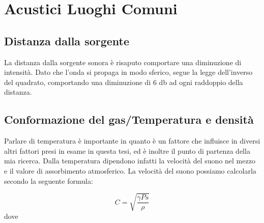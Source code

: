 %

\section{Acustici Luoghi Comuni}


\subsection{Distanza dalla sorgente}

La distanza dalla sorgente sonora è risaputo comportare una diminuzione di
intensità. Dato che l’onda si propaga in modo sferico, segue la legge
dell’inverso del quadrato, comportando una diminuzione di 6 db ad ogni raddoppio
della distanza.

\subsection{Conformazione del gas/Temperatura e densità}

Parlare di temperatura è importante in quanto è un fattore che influisce in
diversi altri fattori presi in esame in questa tesi, ed è inoltre il punto di
partenza della mia ricerca.
Dalla temperatura dipendono infatti la velocità del suono nel mezzo e il valore
di assorbimento atmosferico.
La velocità del suono possiamo calcolarla secondo la seguente formula:

\begin{equation}
C=\sqrt{\frac{\gamma Ps}{\rho}}
\end{equation}
dove

